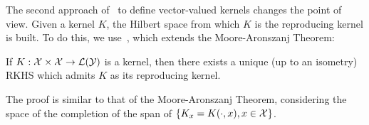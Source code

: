 The second approach of~\citet{MicchelliP05} to define vector-valued kernels changes the point of view. Given a kernel $K$, the Hilbert space from which $K$ is the reproducing kernel is built.
To do this, we use~\citet[Theorem 2.1]{MicchelliP05}, which extends the Moore-Aronszanj Theorem:
\begin{theorem}\label{th:moore-arons_vector}
    If $K: \mathcal{X} \times \mathcal{X} \to \mathcal{L}(\mathcal{Y})$ is a kernel, then there exists a unique (up to an isometry) RKHS which admits $K$ as its reproducing kernel.
\end{theorem}
The proof is similar to that of the Moore-Aronszanj Theorem, considering the space of the completion of the span of $\left\lbrace K_x = K(\cdot, x) , x \in \mathcal{X} \right\rbrace$.

